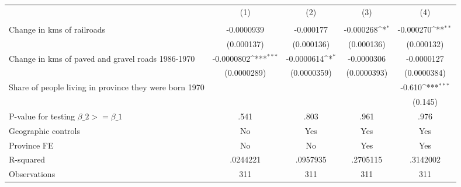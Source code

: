 {
\def\sym#1{\ifmmode^{#1}\else\(^{#1}\)\fi}
\begin{tabular}{l*{4}{c}}
\hline\hline
                &\multicolumn{1}{c}{(1)}&\multicolumn{1}{c}{(2)}&\multicolumn{1}{c}{(3)}&\multicolumn{1}{c}{(4)}\\
                &\multicolumn{1}{c}{}&\multicolumn{1}{c}{}&\multicolumn{1}{c}{}&\multicolumn{1}{c}{}\\
\hline
Change in kms of railroads&-0.0000939         &-0.000177         &-0.000268\sym{*}  &-0.000270\sym{**} \\
                &(0.000137)         &(0.000136)         &(0.000136)         &(0.000132)         \\
[1em]
Change in kms of paved and gravel roads 1986-1970&-0.0000802\sym{***}&-0.0000614\sym{*}  &-0.0000306         &-0.0000127         \\
                &(0.0000289)         &(0.0000359)         &(0.0000393)         &(0.0000384)         \\
[1em]
Share of people living in province they were born 1970&                  &                  &                  &   -0.610\sym{***}\\
                &                  &                  &                  &  (0.145)         \\
\hline
P-value for testing $\beta\_{2} >= \beta\_{1}$&     .541         &     .803         &     .961         &     .976         \\
Geographic controls&       No         &      Yes         &      Yes         &      Yes         \\
Province FE     &       No         &       No         &      Yes         &      Yes         \\
R-squared       & .0244221         & .0957935         & .2705115         & .3142002         \\
Observations    &      311         &      311         &      311         &      311         \\
\hline\hline
\end{tabular}
}
